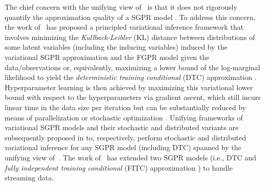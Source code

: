 \documentclass[conference]{IEEEtran}
\begin{document}
	The chief concern with the unifying view of~\cite{candela05} is that it does not rigorously quantify the approximation quality of a SGPR model \cite{Titsias09a}.
	To address this concern, the work of~\cite{Titsias09} has proposed a principled variational inference framework that involves minimizing the \emph{Kullback-Leibler} (KL) distance between distributions of some latent variables (including the inducing variables) induced by the variational SGPR approximation and
 the FGPR model given the data/observations or, equivalently, maximizing a lower bound of the log-marginal likelihood to yield the \emph{deterministic training conditional} (DTC) approximation \cite{Seeger03}. Hyperparameter learning is then achieved by maximizing this variational lower bound with respect to the hyperparameters via gradient ascent, which still incurs linear time in the data size per iteration but can be substantially reduced by means of parallelization \cite{Yarin14} or stochastic optimization \cite{Lawrence13,cheng2016incremental}. 
%
	Unifying frameworks of variational SGPR models and their stochastic and distributed variants are subsequently proposed in \cite{NghiaICML15,HoangICML16} to, respectively, perform stochastic and distributed variational inference 
for any SGPR model (including DTC) spanned by the unifying view of~\cite{candela05}.
The work of~\cite{bui2017streaming} has extended two SGPR models (i.e., DTC and \emph{fully independent training conditional} (FITC) approximation \cite{Snelson06}) to handle streaming data.
\end{document}
